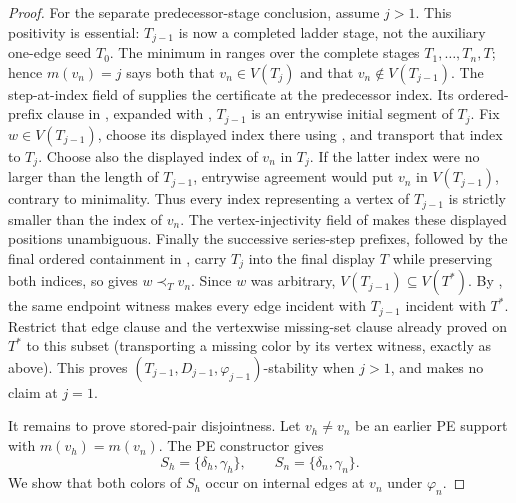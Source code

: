 \begin{proof}
For the separate predecessor-stage conclusion, assume \(j>1\).  This
positivity is essential: \(T_{j-1}\) is now a completed ladder stage, not
the auxiliary one-edge seed \(T_0\).  The minimum in
 ranges over the complete stages
\(T_1,\ldots,T_n,T\); hence \(m(v_n)=j\) says both that \(v_n\in V(T_j)\)
and that \(v_n\notin V(T_{j-1})\).  The step-at-index field of
 supplies the certificate at the predecessor index.
Its ordered-prefix clause in , expanded with
, \(T_{j-1}\) is an entrywise initial
segment of \(T_j\).  Fix \(w\in V(T_{j-1})\), choose its displayed index
there using , and transport that index to
\(T_j\).  Choose also the displayed index of \(v_n\) in \(T_j\).  If the latter index were no larger than the
length of \(T_{j-1}\), entrywise agreement would put \(v_n\) in
\(V(T_{j-1})\), contrary to minimality.  Thus every index representing a
vertex of \(T_{j-1}\) is strictly smaller than the index of \(v_n\).
The vertex-injectivity field of  makes these displayed
positions unambiguous.  Finally the successive series-step prefixes, followed
by the final ordered containment in , carry
\(T_j\) into the final display \(T\) while preserving both indices, so
 gives \(w\prec_Tv_n\).  Since \(w\) was
arbitrary, \(V(T_{j-1})\subseteq V(T^*)\).  By
, the same endpoint witness makes every edge
incident with \(T_{j-1}\) incident with \(T^*\).  Restrict that edge clause
and the vertexwise missing-set clause already proved on \(T^*\) to this
subset (transporting a missing color by its vertex witness, exactly as
above).  This proves
\((T_{j-1},D_{j-1},\varphi_{j-1})\)-stability when \(j>1\), and makes no
claim at \(j=1\).

It remains to prove stored-pair disjointness.  Let \(v_h\ne v_n\) be an
earlier PE support with \(m(v_h)=m(v_n)\).  The PE constructor gives
\[
 S_h=\{\delta_h,\gamma_h\},\qquad
 S_n=\{\delta_n,\gamma_n\}.                                   \tag{7}
\]
We show that both colors of \(S_h\) occur on internal edges at \(v_n\)
under \(\varphi_n\).


\end{proof}
